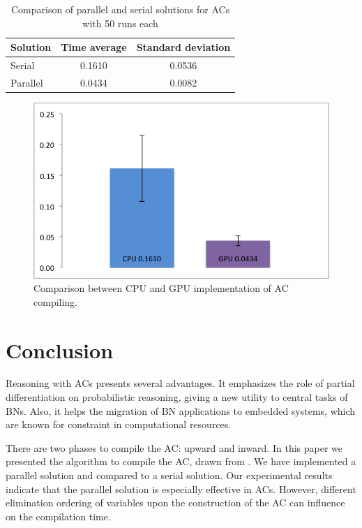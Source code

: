 \documentclass[twoside,11pt]{article}
\begin{document}
 
 
\begin{table}[!h]
	\begin{center}
	\caption{Comparison of parallel and serial solutions for ACs with 50 runs each}
	  \begin{tabular}{ l | cc }
Solution & Time average & Standard deviation \\ \hline
Serial		& 	0.1610		&	0.0536	\\
Parallel 	& 	0.0434		&	0.0082
		\label{tab:bench_bns}
	\end{tabular}
  	\end{center}
\end{table}

\begin{figure}[H]
    \begin{center}
    	\includegraphics[width=0.7\columnwidth]{figures/graph.png}
		\caption{Comparison between CPU and GPU implementation of AC compiling.}
		\label{fig:deri}
    \end{center}
\end{figure}

\section{Conclusion}
\label{sec:conc}

Reasoning with ACs presents several advantages.
It emphasizes the role of partial differentiation on probabilistic reasoning, giving a new utility to central tasks of BNs.
Also, it helps the migration of BN applications to embedded systems, which are known for constraint in computational resources.


There are two phases to compile the AC: upward and inward.
In this paper we presented the algorithm to compile the AC, drawn from \cite{darwiche2009modeling}.
We have implemented a parallel solution and compared to a serial solution.
Our experimental results indicate that the parallel solution is especially effective in ACs.
However, different elimination ordering of variables upon the construction of the AC can influence on the compilation time.

\vskip 0.2in

\end{document}
